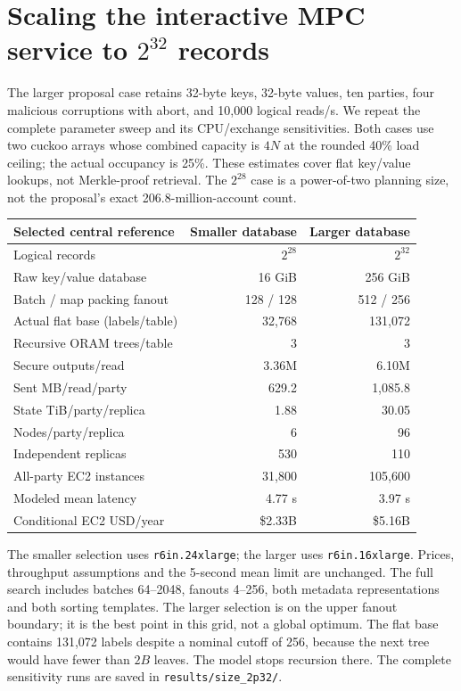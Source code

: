 
\clearpage
\section{Scaling the interactive MPC service to \texorpdfstring{$2^{32}$}{2 to the 32} records}
\label{sec:scale}
The larger proposal case retains 32-byte keys, 32-byte values, ten parties,
four malicious corruptions with abort, and 10,000 logical reads/s. We repeat the
complete parameter sweep and its CPU/exchange sensitivities. Both cases use two
cuckoo arrays whose combined capacity is $4N$ at the rounded 40\% load ceiling;
the actual occupancy is 25\%. These estimates cover flat key/value lookups, not
Merkle-proof retrieval. The $2^{28}$ case is a power-of-two planning size, not the
proposal's exact 206.8-million-account count.

\begin{center}\small\begin{tabular}{lrr}\toprule
Selected central reference & Smaller database & Larger database\\\midrule
Logical records & $2^{28}$ & $2^{32}$ \\
Raw key/value database & 16 GiB & 256 GiB \\
Batch / map packing fanout & 128 / 128 & 512 / 256 \\
Actual flat base (labels/table) & 32,768 & 131,072 \\
Recursive ORAM trees/table & 3 & 3 \\
Secure outputs/read & 3.36M & 6.10M \\
Sent MB/read/party & 629.2 & 1,085.8 \\
State TiB/party/replica & 1.88 & 30.05 \\
Nodes/party/replica & 6 & 96 \\
Independent replicas & 530 & 110 \\
All-party EC2 instances & 31,800 & 105,600 \\
Modeled mean latency & 4.77 s & 3.97 s \\
Conditional EC2 USD/year & \$2.33B & \$5.16B \\
\bottomrule\end{tabular}\end{center}
The smaller selection uses \texttt{r6in.24xlarge}; the larger uses
\texttt{r6in.16xlarge}. Prices, throughput assumptions and the 5-second mean
limit are unchanged. The full search includes batches 64--2048, fanouts 4--256,
both metadata representations and both sorting templates. The larger selection is on the upper fanout boundary; it is the best point in this grid, not a global optimum.
The flat base contains 131,072 labels despite a nominal cutoff of 256, because the next tree would have fewer than $2B$ leaves. The model stops recursion there.
The complete sensitivity runs are saved in \texttt{results/size\_2p32/}.

